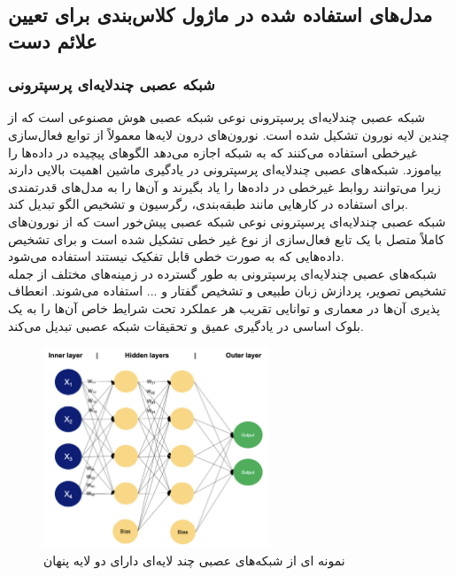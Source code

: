 


\subsection{مدل‌های استفاده شده در ماژول کلاس‌بندی برای تعیین علائم دست}

\subsubsection{شبکه عصبی  چندلایه‌ای پرسپترونی}
شبکه عصبی  چندلایه‌ای پرسپترونی  نوعی شبکه عصبی  هوش مصنوعی است که از چندین لایه نورون تشکیل شده است. نورون‌های درون لایه‌ها معمولاً از
توابع فعال‌سازی غیرخطی  استفاده می‌کنند که به شبکه اجازه می‌دهد الگوهای پیچیده در داده‌ها را بیاموزد. شبکه‌های عصبی چندلایه‌ای پرسپترونی در 
یادگیری ماشین اهمیت بالایی دارند زیرا می‌توانند روابط غیرخطی در داده‌ها را یاد بگیرند و آن‌ها را به مدل‌های قدرتمندی برای استفاده در کارهایی مانند طبقه‌بندی، رگرسیون و تشخیص الگو تبدیل کند. 
\\
شبکه عصبی چندلایه‌ای پرسپترونی نوعی شبکه عصبی پیش‌خور است که از نورون‌های کاملاً متصل با یک تابع فعال‌سازی از نوع غیر خطی تشکیل شده است و  برای تشخیص داده‌هایی که به صورت خطی قابل تفکیک نیستند استفاده می‌شود.
\\
شبکه‌های عصبی چندلایه‌ای پرسپترونی به طور گسترده در زمینه‌های مختلف از جمله تشخیص تصویر، پردازش زبان طبیعی و تشخیص گفتار و ... استفاده می‌شوند. انعطاف پذیری آن‌ها در
معماری و توانایی تقریب هر عملکرد تحت شرایط خاص آن‌ها را به یک بلوک اساسی در یادگیری عمیق و تحقیقات شبکه عصبی تبدیل می‌کند. 

\begin{figure}[h]
    \centering
    \includegraphics[width=0.6\textwidth]{MLP.png}
    \caption[نمونه ای از شبکه‌های عصبی چند لایه‌ای دارای دو لایه پنهان]{نمونه ای از شبکه‌های عصبی چند لایه‌ای دارای دو لایه پنهان\cite{Multilay58:online}}
\end{figure}



